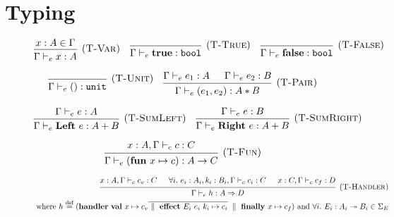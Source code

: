 \documentclass[class=article, crop=false]{standalone}
\begin{document}
\section{Typing}
\label{sec:full-typing}

\begin{figure}[H]
    $$
    \begin{prooftree}
      \hypo{x : A \in \Gamma}
      \infer1[(\textsc{T-Var})]{\Gamma \vdash_e x : A}
    \end{prooftree}\quad
    \begin{prooftree}
      \hypo{}
      \infer1[(\textsc{T-True})]{\Gamma \vdash_e \effTrue : \boolType}
    \end{prooftree}\quad
    \begin{prooftree}
      \hypo{}
      \infer1[(\textsc{T-False})]{\Gamma \vdash_e \effFalse : \boolType}
    \end{prooftree}
    $$
    
    $$
    \begin{prooftree}
      \hypo{}
      \infer1[(\textsc{T-Unit})]{\Gamma \vdash_e () : \unitType}
    \end{prooftree}
    \quad
    \begin{prooftree}
      \hypo{\Gamma \vdash_e e_1 : A}
      \hypo{\Gamma \vdash_e e_2 : B}
      \infer2[(\textsc{T-Pair})]{\Gamma \vdash_e (e_1, e_2) : A * B}
    \end{prooftree}
    $$
    
    $$
    \begin{prooftree}
      \hypo{\Gamma \vdash_e e : A}
      \infer1[(\textsc{T-SumLeft})]{\Gamma \vdash_e \effLeft e : A + B}
    \end{prooftree}
    \quad
    \begin{prooftree}
      \hypo{\Gamma \vdash_e e : B}
      \infer1[(\textsc{T-SumRight})]{\Gamma \vdash_e \effRight e : A + B}
    \end{prooftree}
    $$
    
    $$
    \begin{prooftree}
      \hypo{x : A, \Gamma \vdash_c c : C}
      \infer1[(\textsc{T-Fun})]{\Gamma \vdash_e (\effFun x \mapsto c) : A \to C}
    \end{prooftree}
    $$
  
    \begin{align*}
      {\begin{prooftree}
        \hypo{x : A, \Gamma \vdash_c c_v : C}
        \hypo{\forall i.\ e_i : A_i, k_i : B_i, \Gamma \vdash_c c_i : C}
        \hypo{x : C, \Gamma \vdash_c c_f : D}
        \infer3[(\textsc{T-Handler})]{\Gamma \vdash_e h : A \handlerType D}
      \end{prooftree}}\\
      \text{ where }
      h \defEq (
        \effHandler
          \effVal x \mapsto c_v
          \overline{\dmid \effEffect E_i\ e_i\ k_i \mapsto c_i} \dmid
          \effFinally x \mapsto c_f)
      \text{ and } \forall i.\ E_i : A_i \tto B_i \in \Sigma_E
    \end{align*}


\end{figure}
\end{document}
